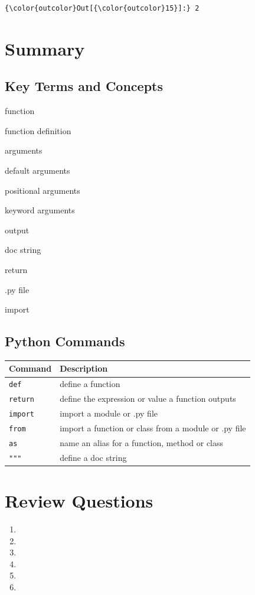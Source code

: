 \documentclass{book}
\begin{document}
\begin{Verbatim}[commandchars=\\\{\}]
{\color{outcolor}Out[{\color{outcolor}15}]:} 2
\end{Verbatim}
            
    \section{Summary}\label{summary}

    \subsection{Key Terms and Concepts}\label{key-terms-and-concepts}

function

function definition

arguments

default arguments

positional arguments

keyword arguments

output

doc string

return

.py file

import

\subsection{Python Commands}\label{python-commands}

\begin{longtable}[]{@{}ll@{}}
\toprule
Command & Description\tabularnewline
\midrule
\endhead
\lstinline!def! & define a function\tabularnewline
\lstinline!return! & define the expression or value a function
outputs\tabularnewline
\lstinline!import! & import a module or .py file\tabularnewline
\lstinline!from! & import a function or class from a module or .py
file\tabularnewline
\lstinline!as! & name an alias for a function, method or
class\tabularnewline
\lstinline!"""! & define a doc string\tabularnewline
\bottomrule
\end{longtable}

    \section{Review Questions}\label{review-questions}

    \begin{enumerate}
\def\labelenumi{\arabic{enumi}.}
\item
\item
\item
\item
\item
\item
\end{enumerate}
\end{document}
